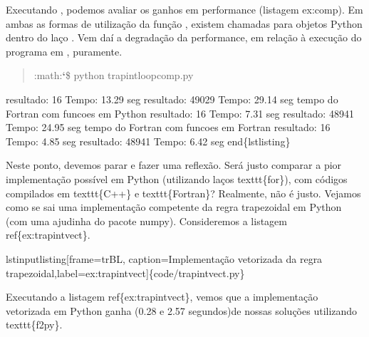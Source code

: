 \documentclass[a4paper,10pt,brazil]{sphinxmanual}
\begin{document}
Executando , podemos avaliar os ganhos em
performance (listagem ex:comp). Em ambas as formas de utilização da
função , existem chamadas para objetos Python dentro do
laço . Vem daí a degradação da performance, em relação à
execução do programa em , puramente.
\begin{quote}

:math:{\color{red}\bfseries{}{}`}\$ python trapintloopcomp.py
\end{quote}

resultado: 16
Tempo: 13.29 seg
resultado: 49029
Tempo: 29.14 seg
tempo do Fortran com funcoes em Python
resultado: 16
Tempo: 7.31 seg
resultado: 48941
Tempo: 24.95 seg
tempo do Fortran com funcoes em Fortran
resultado: 16
Tempo: 4.85 seg
resultado: 48941
Tempo: 6.42 seg
end\{lstlisting\}

Neste ponto, devemos parar e fazer uma reflexão. Será justo comparar a pior implementação possível em Python (utilizando laços texttt\{for\}), com códigos compilados em texttt\{C++\} e texttt\{Fortran\}? Realmente, não é justo. Vejamos como se sai uma implementação competente  da regra trapezoidal em Python (com uma ajudinha do pacote numpy). Consideremos a listagem ref\{ex:trapintvect\}.

lstinputlisting{[}frame=trBL, caption=Implementação vetorizada da regra trapezoidal,label=ex:trapintvect{]}\{code/trapintvect.py\}

Executando a listagem ref\{ex:trapintvect\}, vemos que a implementação vetorizada em Python ganha (0.28 e 2.57 segundos)de nossas soluções utilizando texttt\{f2py\}.
\end{document}
